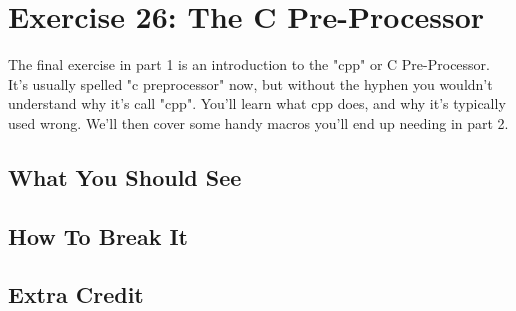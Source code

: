 \chapter{Exercise 26: The C Pre-Processor}

The final exercise in part 1 is an introduction to the "cpp" or C Pre-Processor.
It's usually spelled "c preprocessor" now, but without the hyphen you wouldn't
understand why it's call "cpp".  You'll learn what cpp does, and why it's 
typically used wrong.  We'll then cover some handy macros you'll end up
needing in part 2.


\section{What You Should See}


\section{How To Break It}


\section{Extra Credit}



